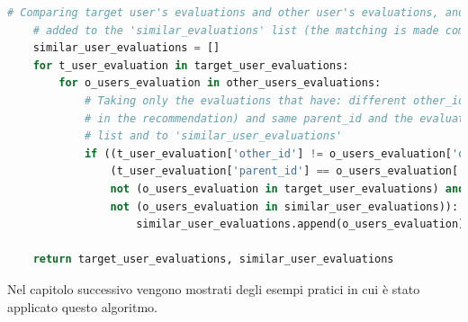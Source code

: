 \begin{itemize}
    \lstset{style=python_code_style}
    \begin{lstlisting}[language=Python, label=lst:UB_CF_4]
    # Comparing target user's evaluations and other user's evaluations, and if there is a match the evaluation is
    # added to the 'similar_evaluations' list (the matching is made comparing the 'parent_id')
    similar_user_evaluations = []
    for t_user_evaluation in target_user_evaluations:
        for o_users_evaluation in other_users_evaluations:
            # Taking only the evaluations that have: different other_id (excluding the target evaluation
            # in the recommendation) and same parent_id and the evaluations that weren't added to 'target_user_evaluations'
            # list and to 'similar_user_evaluations'
            if ((t_user_evaluation['other_id'] != o_users_evaluation['other_id']) and
                (t_user_evaluation['parent_id'] == o_users_evaluation['parent_id']) and
                not (o_users_evaluation in target_user_evaluations) and 
                not (o_users_evaluation in similar_user_evaluations)):
                    similar_user_evaluations.append(o_users_evaluation)
    
    return target_user_evaluations, similar_user_evaluations
    \end{lstlisting}
\end{itemize}
%
Nel capitolo successivo vengono mostrati degli esempi pratici in cui è stato applicato questo algoritmo.
%
\newpage
%
